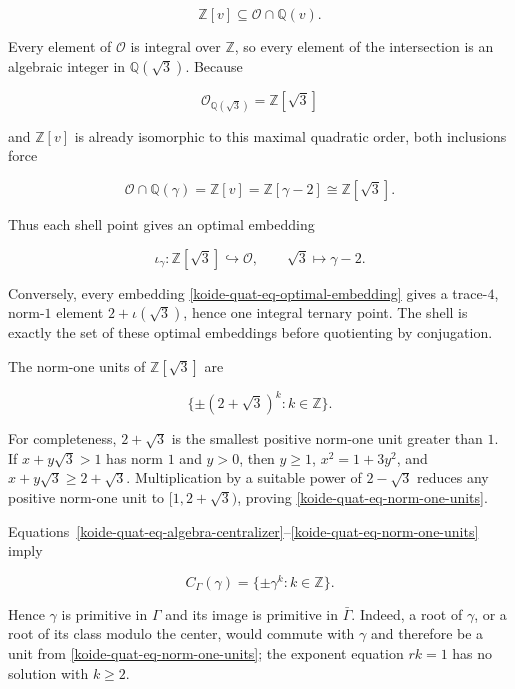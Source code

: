 \[
 \mathbb Z[v]\subseteq\mathcal O\cap\mathbb Q(v).
\]

Every element of \(\mathcal O\) is integral over \(\mathbb Z\), so every element of the intersection is an algebraic integer in \(\mathbb Q(\sqrt3)\). Because

\[
 \mathcal O_{\mathbb Q(\sqrt3)}=\mathbb Z[\sqrt3]
\]

and \(\mathbb Z[v]\) is already isomorphic to this maximal quadratic order, both inclusions force

\begin{equation}\label{koide-quat-eq-optimal-intersection}
 \boxed{
 \mathcal O\cap\mathbb Q(\gamma)
 =\mathbb Z[v]=\mathbb Z[\gamma-2]
 \cong\mathbb Z[\sqrt3].}
\end{equation}

Thus each shell point gives an optimal embedding

\begin{equation}\label{koide-quat-eq-optimal-embedding}
 \iota_\gamma:\mathbb Z[\sqrt3]\hookrightarrow\mathcal O,
 \qquad \sqrt3\longmapsto\gamma-2.
\end{equation}

Conversely, every embedding \eqref{koide-quat-eq-optimal-embedding} gives a trace-\(4\), norm-\(1\) element \(2+\iota(\sqrt3)\), hence one integral ternary point. The shell is exactly the set of these optimal embeddings before quotienting by conjugation.

The norm-one units of \(\mathbb Z[\sqrt3]\) are

\begin{equation}\label{koide-quat-eq-norm-one-units}
 \{\pm(2+\sqrt3)^k:k\in\mathbb Z\}.
\end{equation}

For completeness, \(2+\sqrt3\) is the smallest positive norm-one unit greater than \(1\). If \(x+y\sqrt3>1\) has norm \(1\) and \(y>0\), then \(y\ge1\), \(x^2=1+3y^2\), and \(x+y\sqrt3\ge2+\sqrt3\). Multiplication by a suitable power of \(2-\sqrt3\) reduces any positive norm-one unit to \([1,2+\sqrt3)\), proving \eqref{koide-quat-eq-norm-one-units}.

Equations~\eqref{koide-quat-eq-algebra-centralizer}--\eqref{koide-quat-eq-norm-one-units} imply

\begin{equation}\label{koide-quat-eq-group-centralizer}
 C_\Gamma(\gamma)=\{\pm\gamma^k:k\in\mathbb Z\}.
\end{equation}

Hence \(\gamma\) is primitive in \(\Gamma\) and its image is primitive in \(\bar\Gamma\). Indeed, a root of \(\gamma\), or a root of its class modulo the center, would commute with \(\gamma\) and therefore be a unit from \eqref{koide-quat-eq-norm-one-units}; the exponent equation \(rk=1\) has no solution with \(k\ge2\).

